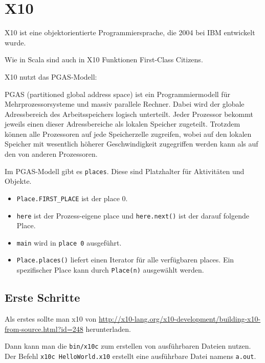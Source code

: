 \chapter{X10}%
X10 ist eine objektorientierte Programmiersprache, die 2004 bei IBM entwickelt
wurde.

Wie in Scala sind auch in X10 Funktionen First-Class Citizens.

X10 nutzt das PGAS-Modell:

\begin{definition}%
    PGAS (partitioned global address space) ist ein Programmiermodell für
    Mehrprozessorsysteme und massiv parallele Rechner. Dabei wird der globale
    Adressbereich des Arbeitsspeichers logisch unterteilt. Jeder Prozessor
    bekommt jeweils einen dieser Adressbereiche als lokalen Speicher zugeteilt.
    Trotzdem können alle Prozessoren auf jede Speicherzelle zugreifen, wobei auf
    den lokalen Speicher mit wesentlich höherer Geschwindigkeit zugegriffen
    werden kann als auf den von anderen Prozessoren.
\end{definition}

Im PGAS-Modell gibt es \texttt{places}. Diese sind Platzhalter für Aktivitäten
und Objekte.

\begin{itemize}
    \item \texttt{Place.FIRST\_PLACE} ist der place 0.
    \item \texttt{here} ist der Prozess-eigene place und \texttt{here.next()} ist
          der darauf folgende Place.
    \item \texttt{main} wird in \texttt{place 0} ausgeführt.
    \item \texttt{Place.places()} liefert einen Iterator für alle verfügbaren places.
          Ein spezifischer Place kann durch \texttt{Place(n)} ausgewählt werden.
\end{itemize}

\section{Erste Schritte}
Als erstes sollte man x10 von \url{http://x10-lang.org/x10-development/building-x10-from-source.html?id=248} herunterladen.

Dann kann man die \texttt{bin/x10c} zum erstellen von ausführbaren Dateien nutzen.
Der Befehl \texttt{x10c HelloWorld.x10} erstellt eine ausführbare Datei namens
\texttt{a.out}.

